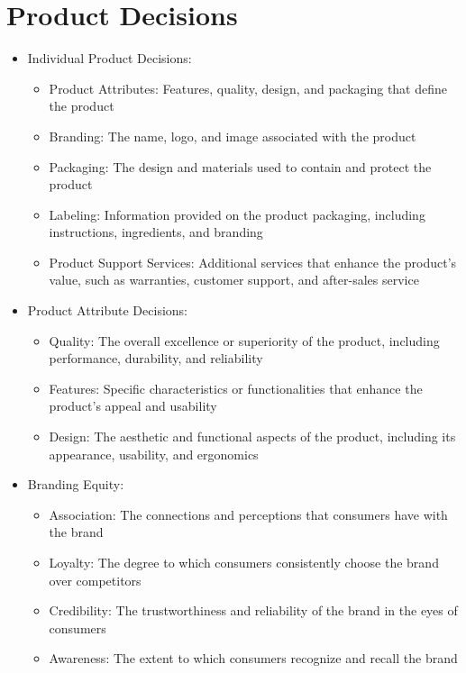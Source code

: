 \documentclass[openany,12pt,a4paper]{book}
\begin{document}
\section{Product Decisions}
\begin{itemize}
    \item Individual Product Decisions:
    \begin{itemize}
        \item Product Attributes: Features, quality, design, and packaging that define the product
        \item Branding: The name, logo, and image associated with the product
        \item Packaging: The design and materials used to contain and protect the product
        \item Labeling: Information provided on the product packaging, including instructions, ingredients, and branding
        \item Product Support Services: Additional services that enhance the product's value, such as warranties, customer support, and after-sales service
    \end{itemize}
    \item Product Attribute Decisions:
    \begin{itemize}
        \item Quality: The overall excellence or superiority of the product, including performance, durability, and reliability
        \item Features: Specific characteristics or functionalities that enhance the product's appeal and usability
        \item Design: The aesthetic and functional aspects of the product, including its appearance, usability, and ergonomics
    \end{itemize}
    \item Branding Equity:
    \begin{itemize}
        \item Association: The connections and perceptions that consumers have with the brand
        \item Loyalty: The degree to which consumers consistently choose the brand over competitors
        \item Credibility: The trustworthiness and reliability of the brand in the eyes of consumers
        \item Awareness: The extent to which consumers recognize and recall the brand
    \end{itemize}

\end{itemize}
\end{document}
